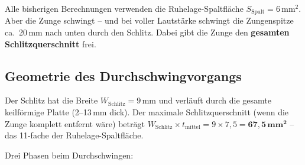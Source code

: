 \documentclass[11pt,a4paper]{article}
\begin{document}
Alle bisherigen Berechnungen verwenden die Ruhelage-Spaltfläche $S_\text{Spalt} = 6\,\text{mm}^2$. Aber die Zunge schwingt -- und bei voller Lautstärke schwingt die Zungenspitze ca.\ 20\,mm nach unten durch den Schlitz. Dabei gibt die Zunge den \textbf{gesamten Schlitzquerschnitt} frei.

\subsection{Geometrie des Durchschwingvorgangs}

Der Schlitz hat die Breite $W_\text{Schlitz} = 9$\,mm und verläuft durch die gesamte keilförmige Platte (2--13\,mm dick). Der maximale Schlitzquerschnitt (wenn die Zunge komplett entfernt wäre) beträgt $W_\text{Schlitz} \times t_\text{mittel} = 9 \times 7{,}5 = \mathbf{67{,}5\,\text{mm}^2}$ -- das 11-fache der Ruhelage-Spaltfläche.

Drei Phasen beim Durchschwingen:

\begin{table}[H]
\centering\small
{}
\caption{Effektiver Durchströmquerschnitt bei verschiedenen Tip-Positionen}
\end{table}
\end{document}
